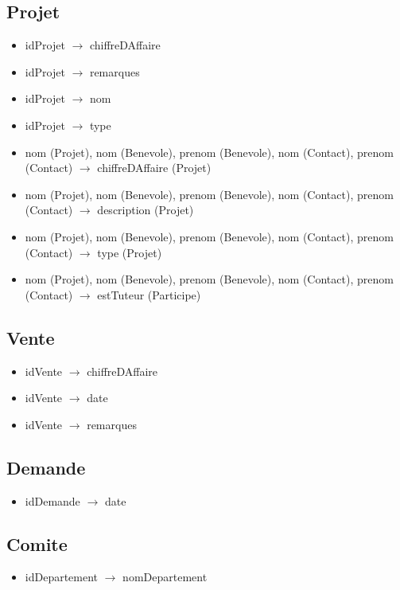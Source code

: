 \documentclass[asi, sansVersion]{picInsa}
\begin{document}
\subsection*{Projet}
\begin{itemize}
\item[] idProjet $\rightarrow$ chiffreDAffaire
\item[] idProjet $\rightarrow$ remarques
\item[] idProjet $\rightarrow$ nom
\item[] idProjet $\rightarrow$ type
\item[]	nom (Projet), nom (Benevole), prenom (Benevole), nom (Contact), prenom (Contact) $\rightarrow$ chiffreDAffaire (Projet)
\item[]	nom (Projet), nom (Benevole), prenom (Benevole), nom (Contact), prenom (Contact) $\rightarrow$ description (Projet)
\item[]	nom (Projet), nom (Benevole), prenom (Benevole), nom (Contact), prenom (Contact) $\rightarrow$ type (Projet)
\item[]	nom (Projet), nom (Benevole), prenom (Benevole), nom (Contact), prenom (Contact) $\rightarrow$ estTuteur (Participe)
\end{itemize}

\subsection*{Vente}
\begin{itemize}
\item[]	idVente $\rightarrow$ chiffreDAffaire
\item[]	idVente $\rightarrow$ date
\item[]	idVente $\rightarrow$ remarques
\end{itemize}

\subsection*{Demande}
\begin{itemize}
\item[] idDemande $\rightarrow$ date
\end{itemize}

\subsection*{Comite}
\begin{itemize}
\item[] idDepartement $\rightarrow$ nomDepartement
\end{itemize}
\end{document}
